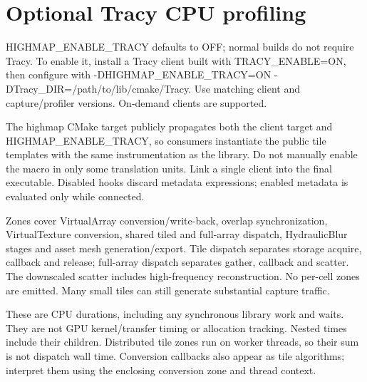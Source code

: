 \chapter{Optional Tracy CPU profiling }
\hypertarget{md_docs_2profiling}{}\label{md_docs_2profiling}
\label{md_docs_2profiling_autotoc_md149}%
%


{\ttfamily HIGHMAP\+\_\+\+ENABLE\+\_\+\+TRACY} defaults to {\ttfamily OFF}; normal builds do not require Tracy. To enable it, install a Tracy client built with {\ttfamily TRACY\+\_\+\+ENABLE=ON}, then configure with {\ttfamily -\/DHIGHMAP\+\_\+\+ENABLE\+\_\+\+TRACY=ON -\/DTracy\+\_\+\+DIR=/path/to/lib/cmake/\+Tracy}. Use matching client and capture/profiler versions. On-\/demand clients are supported.

The {\ttfamily highmap} CMake target publicly propagates both the client target and {\ttfamily HIGHMAP\+\_\+\+ENABLE\+\_\+\+TRACY}, so consumers instantiate the public tile templates with the same instrumentation as the library. Do not manually enable the macro in only some translation units. Link a single client into the final executable. Disabled hooks discard metadata expressions; enabled metadata is evaluated only while connected.

Zones cover Virtual\+Array conversion/write-\/back, overlap synchronization, Virtual\+Texture conversion, shared tiled and full-\/array dispatch, Hydraulic\+Blur stages and asset mesh generation/export. Tile dispatch separates storage acquire, callback and release; full-\/array dispatch separates gather, callback and scatter. The downscaled scatter includes high-\/frequency reconstruction. No per-\/cell zones are emitted. Many small tiles can still generate substantial capture traffic.

These are CPU durations, including any synchronous library work and waits. They are not GPU kernel/transfer timing or allocation tracking. Nested times include their children. Distributed tile zones run on worker threads, so their sum is not dispatch wall time. Conversion callbacks also appear as tile algorithms; interpret them using the enclosing conversion zone and thread context. 